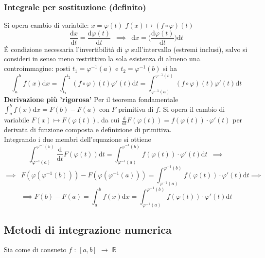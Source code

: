 \documentclass[10pt]{article}
\theoremstyle{plain}
\begin{document}
\subsubsection{Integrale per sostituzione (definito)}
Si opera cambio di variabile: $x = \varphi(t)$ $f(x) \longmapsto (f \circ \varphi)(t)$
\[\frac{\textrm{d}x}{\textrm{d}t} = \frac{\textrm{d}\varphi(t)}{\textrm{d}t} \enspace \implies \enspace \textrm{d}x = \big(\frac{\textrm{d}\varphi(t)}{\textrm{d}t}\big) \textrm{d}t\]
\'E condizione necessaria l'invertibilità di $\varphi$ sull'intervallo (estremi inclusi), salvo si consideri in senso meno restrittivo la sola esistenza di almeno una controimmagine: posti $t_1 = \varphi^{-1}(a)$ e $t_2 = \varphi^{-1}(b)$ si ha
\[\int_a^b f(x)\textrm{d}x = \int_{t_1}^{t_2} (f \circ \varphi)(t)\varphi'(t)\textrm{d}t = \int_{\varphi^{-1}(a)}^{\varphi^{-1}(b)} (f \circ \varphi)(t)\varphi'(t)\textrm{d}t\]
\textbf{Derivazione più 'rigorosa'} Per il teorema fondamentale $\int_a^b f(x)\textrm{d}x = F(b) - F(a)$ con $F$ primitiva di $f$. Si opera il cambio di variabile $F(x) \mapsto F(\varphi(t))$, da cui $\frac{\textrm{d}}{\textrm{d}t} F(\varphi(t)) = f(\varphi(t)) \cdot \varphi'(t)$ per derivata di funzione composta e definizione di primitiva.
\\Integrando i due membri dell'equazione si ottiene
\[\int_{\varphi^{-1}(a)}^{\varphi^{-1}(b)}\frac{\textrm{d}}{\textrm{d}t} F(\varphi(t)) \textrm{d}t = \int_{\varphi^{-1}(a)}^{\varphi^{-1}(b)}f(\varphi(t)) \cdot \varphi'(t)\textrm{d}t \enspace \implies\]
\[\implies \enspace F(\varphi(\varphi^{-1}(b))) - F(\varphi(\varphi^{-1}(a))) = \int_{\varphi^{-1}(a)}^{\varphi^{-1}(b)}f(\varphi(t)) \cdot \varphi'(t)\textrm{d}t \implies\]
\[\implies F(b) - F(a) = \int_a^b f(x)\textrm{d}x = \int_{\varphi^{-1}(a)}^{\varphi^{-1}(b)}f(\varphi(t)) \cdot \varphi'(t)\textrm{d}t\]

\subsection{Metodi di integrazione numerica}
Sia come di consueto $f$ : $[a,b]$ $\rightarrow$ $\mathbb{R}$
\end{document}
